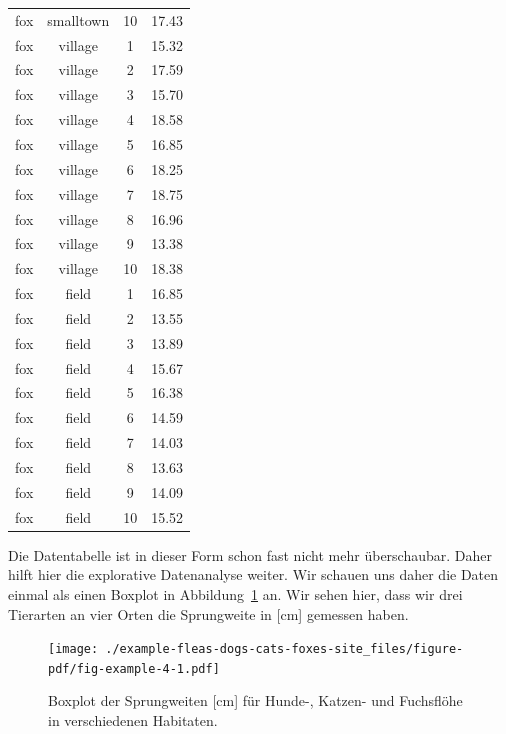 \documentclass[
  letterpaper,
  DIV=11,
  oneside]{scrreport}
\begin{document}
\begin{longtable}[]{@{}cccc@{}}
fox & smalltown & 10 & 17.43 \\
fox & village & 1 & 15.32 \\
fox & village & 2 & 17.59 \\
fox & village & 3 & 15.70 \\
fox & village & 4 & 18.58 \\
fox & village & 5 & 16.85 \\
fox & village & 6 & 18.25 \\
fox & village & 7 & 18.75 \\
fox & village & 8 & 16.96 \\
fox & village & 9 & 13.38 \\
fox & village & 10 & 18.38 \\
fox & field & 1 & 16.85 \\
fox & field & 2 & 13.55 \\
fox & field & 3 & 13.89 \\
fox & field & 4 & 15.67 \\
fox & field & 5 & 16.38 \\
fox & field & 6 & 14.59 \\
fox & field & 7 & 14.03 \\
fox & field & 8 & 13.63 \\
fox & field & 9 & 14.09 \\
fox & field & 10 & 15.52 \\
\bottomrule()
\end{longtable}

{}

Die Datentabelle ist in dieser Form schon fast nicht mehr überschaubar.
Daher hilft hier die explorative Datenanalyse weiter. Wir schauen uns
daher die Daten einmal als einen Boxplot in
Abbildung~\ref{fig-example-4} an. Wir sehen hier, dass wir drei
Tierarten an vier Orten die Sprungweite in {[}cm{]} gemessen haben.

\begin{figure}

{\centering \texttt{[image: ./example-fleas-dogs-cats-foxes-site\_files/figure-pdf/fig-example-4-1.pdf]}

}

\caption{\label{fig-example-4}Boxplot der Sprungweiten {[}cm{]} für
Hunde-, Katzen- und Fuchsflöhe in verschiedenen Habitaten.}

\end{figure}
\end{document}
